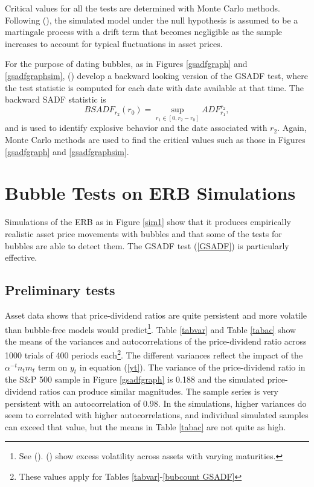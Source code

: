 \documentclass[12pt]{article}
\begin{document}
Critical values for all the tests are determined with Monte Carlo methods. Following \citeauthor{phillips2015testing} (\citeyear{phillips2015testing}), the simulated model under the null hypothesis is assumed to be a martingale process with a drift term that becomes negligible as the sample increases to account for typical fluctuations in asset prices.

For the purpose of dating bubbles, as in Figures \ref{gsadfgraph} and \ref{gsadfgraphsim}, \citeauthor{phillips2015testing} (\citeyear{phillips2015testing}) develop a backward looking version of the GSADF test, where the test statistic is computed for each date with date available at that time. The backward SADF statistic is
\begin{equation}
    BSADF_{r_{2}}(r_{0})=\underset{{r_{1}\in[0,r_{2}-r_{0}]}}{{\sup}}ADF_{r_{1}}^{r_{2}},
    \label{BSADF}
\end{equation}
and is used to identify explosive behavior and the date associated with $r_{2}$. Again, Monte Carlo methods are used to find the critical values such as those in Figures \ref{gsadfgraph} and \ref{gsadfgraphsim}.

\section{Bubble Tests on ERB Simulations}

Simulations of the ERB as in Figure \ref{sim1} show that it produces empirically realistic asset price movements with bubbles and that some of the tests for bubbles are able to detect them. The GSADF test (\ref{GSADF}) is particularly effective. 

\subsection{Preliminary tests}

Asset data shows that price-dividend ratios are quite persistent and more volatile than bubble-free models would predict\footnote{See \citeauthor{shiller1981stock} (\citeyear{shiller1981stock}). \citeauthor{GiglioKelly17excessvolatility} (\citeyear{GiglioKelly17excessvolatility}) show excess volatility across assets with varying maturities.}. Table \ref{tabvar} and Table \ref{tabac} show the means of the variances and autocorrelations of the price-dividend ratio across 1000 trials of 400 periods each\footnote{These values apply for Tables \ref{tabvar}-\ref{bubcount GSADF}}. The different variances reflect the impact of the $\alpha^{-t} n_{t} m_{t}$ term on $y_{t}$ in equation (\ref{yt}). The variance of the price-dividend ratio in the S\&P 500 sample in Figure \ref{gsadfgraph} is 0.188 and the simulated price-dividend ratios can produce similar magnitudes. The sample series is very persistent with an autocorrelation of 0.98. In the simulations, higher variances do seem to correlated with higher autocorrelations, and individual simulated samples can exceed that value, but the means in Table \ref{tabac} are not quite as high.
\end{document}
